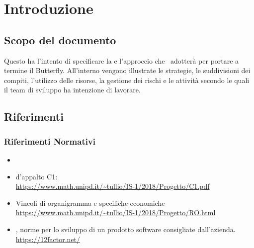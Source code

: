 \newpage
\section{Introduzione} \label{Introduzione}
	
	\subsection{Scopo del documento}
	Questo  ha l'intento di specificare la  e l'approccio che \gruppo\ adotterà per portare a termine il  Butterfly.
	All'interno vengono illustrate le strategie, le suddivisioni dei compiti, l'utilizzo delle risorse, la gestione dei rischi e le attività secondo le quali il team di sviluppo ha intenzione di lavorare.
	
	
    

	
	\subsection{Riferimenti}
		\subsubsection{Riferimenti Normativi}
			\begin{itemize}
				\item \NdPd
				\item {} d'appalto C1:\\
				\url{https://www.math.unipd.it/~tullio/IS-1/2018/Progetto/C1.pdf}
				\item Vincoli di organigramma e specifiche economiche\\
				\url{https://www.math.unipd.it/~tullio/IS-1/2018/Progetto/RO.html}
				\item {}, norme per lo sviluppo di un prodotto software consigliate dall'azienda.\\
				\url{https://12factor.net/}
			\end{itemize}
		
